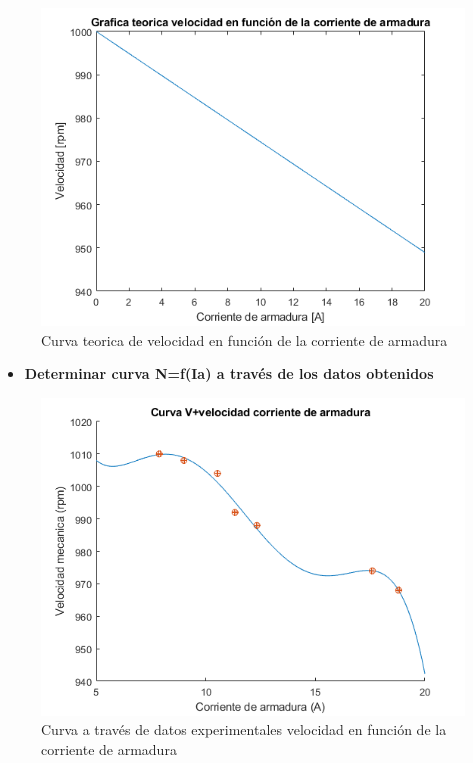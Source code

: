 \documentclass[11pt,letterpaper]{article}     %
\begin{document}
		\begin{figure}[H]
		\centering
		\includegraphics[scale=0.8]{./recursos-Lab6/curvaPredeterminarVelocidadCorrienteArmadura.png}
		\caption{Curva teorica de velocidad en función de la corriente de armadura}
		\label{fig:CurvaPredeterminarVelocidadCorrienteArmadura}
	\end{figure}
	\begin{itemize}
		\item \textbf{Determinar curva N=f(Ia) a través de los datos obtenidos}
	\end{itemize}
	\begin{figure}[H]
		\centering
		\includegraphics[scale=0.8]{./recursos-Lab6/curvaVelocidadCorriente.png}
		\caption{Curva a través de datos experimentales velocidad en función de la corriente de armadura}
		\label{fig:CurvaDeVelocidadCorriente}
	\end{figure}
\end{document}
